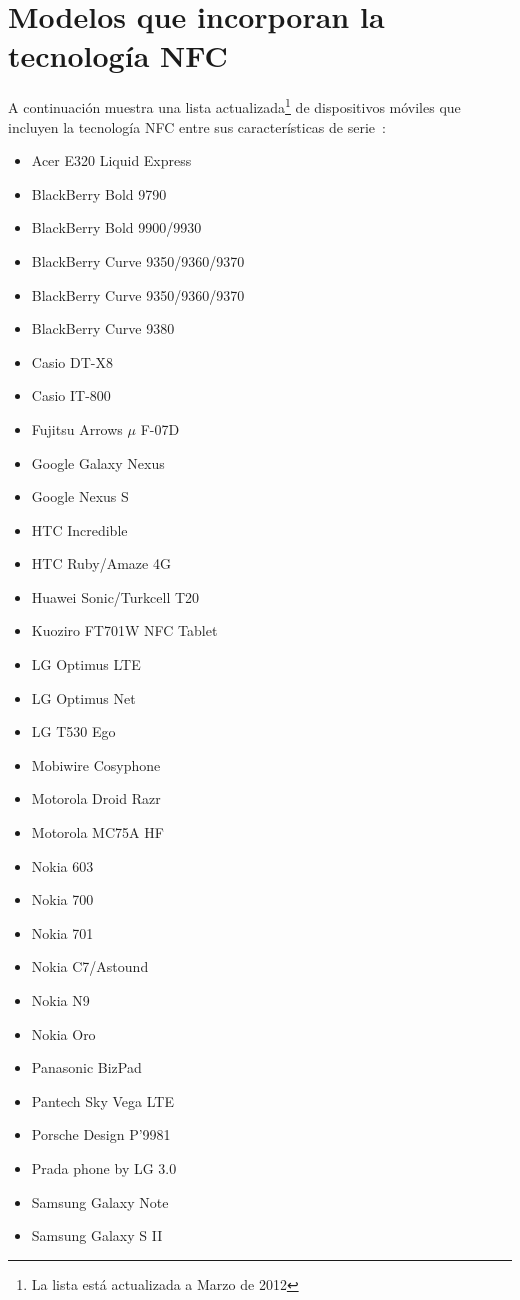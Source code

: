 \chapter{Modelos que incorporan la tecnología \acs{NFC}}
\label{chap:nfcMobiles}
A continuación muestra una lista actualizada\footnote{La lista está 
actualizada a Marzo de 2012} de dispositivos móviles que incluyen la 
tecnología \acs{NFC} entre sus características de serie~\cite{bib:nfcMobiles}:
\begin{itemize}
\item Acer E320 Liquid Express
\item BlackBerry Bold 9790
\item BlackBerry Bold 9900/9930
\item BlackBerry Curve 9350/9360/9370
\item BlackBerry Curve 9350/9360/9370
\item BlackBerry Curve 9380
\item Casio DT-X8
\item Casio IT-800
\item Fujitsu Arrows $\mu$ F-07D
\item Google Galaxy Nexus
\item Google Nexus S
\item HTC Incredible
\item HTC Ruby/Amaze 4G
\item Huawei Sonic/Turkcell T20
\item Kuoziro FT701W NFC Tablet
\item LG Optimus LTE
\item LG Optimus Net
\item LG T530 Ego
\item Mobiwire Cosyphone
\item Motorola Droid Razr
\item Motorola MC75A HF
\item Nokia 603
\item Nokia 700
\item Nokia 701
\item Nokia C7/Astound
\item Nokia N9
\item Nokia Oro
\item Panasonic BizPad
\item Pantech Sky Vega LTE
\item Porsche Design P'9981
\item Prada phone by LG 3.0
\item Samsung Galaxy Note
\item Samsung Galaxy S II

\end{itemize}
